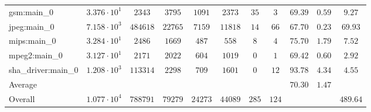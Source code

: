 \begin{tabular}{|l|c|c|c|c|c|c|c|c|c|c|}
gsm:main\_0             & $ 3.376 \cdot 10^{1} $ & $ 2343   $ & $ 3795  $ & $ 1091  $ & $ 2373  $ & $ 35  $ & $ 3   $ & $ 69.39       $ & $ 0.59    $ & $ 9.27    $ \\
jpeg:main\_0            & $ 7.158 \cdot 10^{3} $ & $ 484618 $ & $ 22765 $ & $ 7159  $ & $ 11818 $ & $ 14  $ & $ 66  $ & $ 67.70       $ & $ 0.23    $ & $ 69.93   $ \\
mips:main\_0            & $ 3.284 \cdot 10^{1} $ & $ 2486   $ & $ 1669  $ & $ 487   $ & $ 558   $ & $ 8   $ & $ 4   $ & $ 75.70       $ & $ 1.79    $ & $ 7.52    $ \\
mpeg2:main\_0           & $ 3.127 \cdot 10^{1} $ & $ 2171   $ & $ 2022  $ & $ 604   $ & $ 1019  $ & $ 0   $ & $ 1   $ & $ 69.42       $ & $ 0.60    $ & $ 2.92    $ \\
sha\_driver:main\_0     & $ 1.208 \cdot 10^{3} $ & $ 113314 $ & $ 2298  $ & $ 709   $ & $ 1601  $ & $ 0   $ & $ 12  $ & $ 93.78       $ & $ 4.34    $ & $ 4.55    $ \\
\hline
Average                 & $                    $ & $        $ & $       $ & $       $ & $       $ & $     $ & $     $ & $ 70.30       $ & $ 1.47    $ & $         $ \\
\hline
Overall                 & $ 1.077 \cdot 10^{4} $ & $ 788791 $ & $ 79279 $ & $ 24273 $ & $ 44089 $ & $ 285 $ & $ 124 $ & $             $ & $         $ & $ 489.64  $ \\
\hline
\end{tabular}
